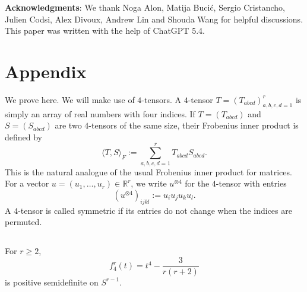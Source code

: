 \documentclass[12pt]{amsart}
\theoremstyle{myremark}
\newcommand{\1}{\mathbf{1}}
\newcommand{\froinner}[2]{\langle #1,#2\rangle_{\!F}}
\begin{document}
\textbf{Acknowledgments}:
We thank Noga Alon, Matija Bucić, Sergio Cristancho, Julien Codsi, Alex Divoux, Andrew Lin and Shouda Wang for helpful discussions. This paper was written with the help of ChatGPT 5.4.


\providecommand{\MR}[1]{}
\providecommand{\MRhref}[2]{%
  \href{http://www.ams.org/mathscinet-getitem?mr=#1}{#2}
}

   
   

\pagebreak

\section*{Appendix}

We prove  here. We will make use of $4$-tensors. A $4$-tensor $T=(T_{abcd})_{a,b,c,d=1}^r$ is simply an array of real numbers with four indices.  
If $T=(T_{abcd})$ and $S=(S_{abcd})$ are two $4$-tensors of the same size, their Frobenius inner product is defined by
\[
\froinner{T}{S}:=\sum_{a,b,c,d=1}^r T_{abcd}S_{abcd}.
\]
This is the natural analogue of the usual Frobenius inner product for matrices.  
For a vector $u=(u_1,\dots,u_r)\in\mathbb R^r$, we write $u^{\otimes 4}$ for the $4$-tensor with entries
\[
(u^{\otimes 4})_{ijkl}:=u_i u_j u_k u_l.
\]
A $4$-tensor is called symmetric if its entries do not change when the indices are permuted.

\subsection*{} For $r \geq 2$,
\[
f_4^r(t)=t^4-\frac{3}{r(r+2)}
\]
is positive semidefinite on \(S^{r-1}\).
\end{document}
